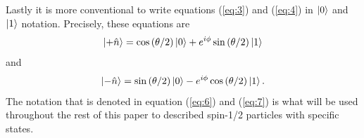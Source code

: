 \documentclass[twocolumn]{article}
\begin{document}
Lastly it is more conventional to write equations (\ref{eq:3}) and (\ref{eq:4}) in $\ket{0}$ and $\ket{1}$ notation. Precisely, these equations are
\begin{equation} \label{eq:6}
\ket{+\hat{n}}=\cos{(\theta/2)}\ket{0}+e^{i\phi}\sin{(\theta/2)}\ket{1}
\end{equation}
and
\begin{equation} \label{eq:7}
\ket{-\hat{n}}=\sin{(\theta/2)}\ket{0}-e^{i\phi}\cos{(\theta/2)}\ket{1}.
\end{equation}
The notation that is denoted in equation (\ref{eq:6}) and (\ref{eq:7}) is what will be used throughout the rest of this paper to described spin-1/2 particles with specific states.
\end{document}
